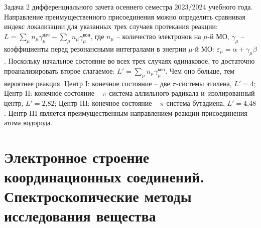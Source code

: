 Задача 2 дифференциального зачета осеннего семестра 2023/2024 учебного года. Направление преимущественного присоединения можно определить сравнивая индекс локализации для указанных трех случаев протекания реакции: $L=\sum_{\mu} n_{\mu}  \gamma_{\mu}^{\text{нач}} - \sum_{\mu} n_{\mu}  \gamma_{\mu}^{\text{кон}}$, где $n_{\mu}$ – количество электронов на $\mu$-й МО, $\gamma_{\mu}$ – коэффициенты перед резонансными интегралами в энегрии $\mu$-й МО: $\varepsilon_{\mu}=\alpha+\gamma_{\mu} \beta$. Поскольку начальное состояние во всех трех случаях одинаковое, то достаточно проанализировать второе слагаемое: $L'=\sum_{\mu} n_{\mu}  \gamma_{\mu}^{\text{кон}}$. Чем оно больше, тем вероятнее реакция. Центр I: конечное состояние – две $\pi$-системы этилена, $L'=\text{4}$; Центр II: конечное состояние – $\pi$-система аллильного радикала и~изолированный центр, $L'=\text{2,82}$; Центр III: конечное состояние – $\pi$-система бутадиена, $L'=\text{4,48}$. Центр III является преимущественным направлением реакции присоединения атома водорода.\par
\newpage

\section[Спектроскопические методы исследования вещества]{\texorpdfstring{Электронное строение координационных соединений.\\Спектроскопические методы исследования вещества}{Электронное строение координационных соединений. Спектроскопические методы исследования вещества}}

